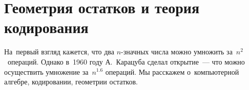 
\section*{Геометрия остатков и теория кодирования}



На~первый взгляд кажется, что два $n$-значных числа можно умножить
за~$n^2$~операций.
Однако в~1960 году А.~Карацуба сделал открытие~--- что можно осуществить
умножение за~$n^{1.6}$ операций.
Мы расскажем о~компьютерной алгебре, кодировании, геометрии остатков.

